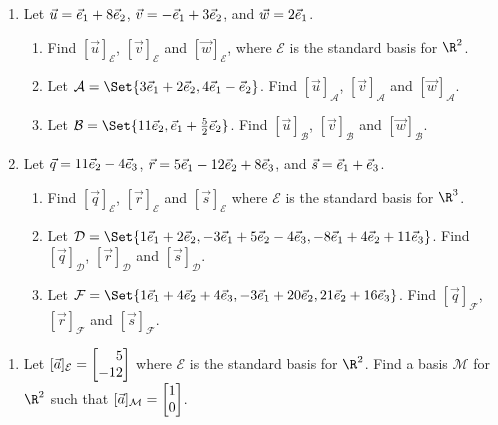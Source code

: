 \begin{exercises}

	\begin{problist}
		\prob
		\begin{enumerate}
			\item Let $\vec u={\vec e_1}+8{\vec e_2}$, $\vec v=-{\vec e_1}+ 3{\vec e_2}$,
				and $\vec w=2{\vec e_1}$.


				\begin{enumerate}
					\item Find $[\vec u]_{\mathcal E}$,
						$[\vec v]_{\mathcal E}$ and
						$[\vec w]_{\mathcal E}$, where $\mathcal
						E$ is the standard basis for $\R^{2}$.

					\item Let $\mathcal A=\Set{3\xhat+2\yhat,4\xhat-\yhat}$.
						Find $[\vec u]_{\mathcal A}$, $[\vec
						v]_{\mathcal A}$ and $[\vec w]_{\mathcal
						A}$.

					\item Let $\mathcal B=\Set{11\yhat,\xhat+\frac{5}{2}\yhat}$.
						Find $[\vec u]_{\mathcal B}$, $[\vec
						v]_{\mathcal B}$ and $[\vec w]_{\mathcal
						B}$.
				\end{enumerate}

			\item Let $\vec q=11{\vec e_2}-4{\vec e_3}$,
				$\vec r=5{\vec e_1}-12{\vec e_2}+8{\vec e_3}$, and $\vec s={\vec e_1}+{\vec e_3}$.


				\begin{enumerate}
					\item Find $[\vec q]_{\mathcal E}$,
						$[\vec r]_{\mathcal E}$ and
						$[\vec s]_{\mathcal E}$ where
						$\mathcal E$ is the standard
						basis for $\R^{3}$.

					\item Let $\mathcal D=\Set{1\xhat+2\yhat,-3\xhat+5\yhat-4\zhat,-8\xhat+4\yhat+11\zhat}$.
						Find $[\vec q]_{\mathcal D}$, $[\vec
						r]_{\mathcal D}$ and $[\vec s]_{\mathcal
						D}$.

					\item Let $\mathcal F=\Set{1\xhat+4\yhat+4\zhat,-3\xhat+20\yhat,21\yhat+16\zhat}$.
						Find $[\vec q]_{\mathcal F}$, $[\vec
						r]_{\mathcal F}$ and $[\vec s]_{\mathcal
						F}$.
				\end{enumerate}
		\end{enumerate}

		\prob
		\begin{enumerate}
			\item Let $[\vec a]_{\mathcal E}=\mat{5\\-12}$ where $\mathcal
				E$ is the standard basis for $\R^{2}$. Find a
				basis $\mathcal M$ for $\R^{2}$ such that
				$[\vec a]_{\mathcal M}=\mat{1\\0}$.


\end{enumerate}
\end{problist}
\end{exercises}
